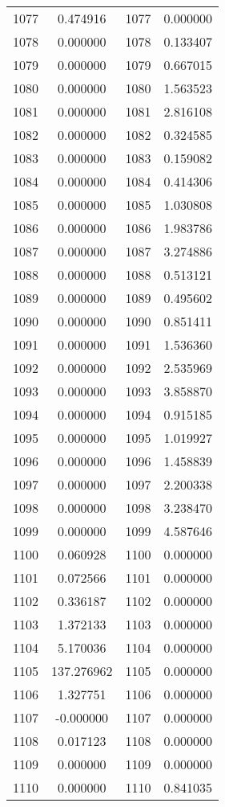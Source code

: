\documentclass[12pt]{article}
\begin{document}
\begin{longtable}{@{}cccc@{}}
1077 & 0.474916 & 1077 & 0.000000 \\
1078 & 0.000000 & 1078 & 0.133407 \\
1079 & 0.000000 & 1079 & 0.667015 \\
1080 & 0.000000 & 1080 & 1.563523 \\
1081 & 0.000000 & 1081 & 2.816108 \\
1082 & 0.000000 & 1082 & 0.324585 \\
1083 & 0.000000 & 1083 & 0.159082 \\
1084 & 0.000000 & 1084 & 0.414306 \\
1085 & 0.000000 & 1085 & 1.030808 \\
1086 & 0.000000 & 1086 & 1.983786 \\
1087 & 0.000000 & 1087 & 3.274886 \\
1088 & 0.000000 & 1088 & 0.513121 \\
1089 & 0.000000 & 1089 & 0.495602 \\
1090 & 0.000000 & 1090 & 0.851411 \\
1091 & 0.000000 & 1091 & 1.536360 \\
1092 & 0.000000 & 1092 & 2.535969 \\
1093 & 0.000000 & 1093 & 3.858870 \\
1094 & 0.000000 & 1094 & 0.915185 \\
1095 & 0.000000 & 1095 & 1.019927 \\
1096 & 0.000000 & 1096 & 1.458839 \\
1097 & 0.000000 & 1097 & 2.200338 \\
1098 & 0.000000 & 1098 & 3.238470 \\
1099 & 0.000000 & 1099 & 4.587646 \\
1100 & 0.060928 & 1100 & 0.000000 \\
1101 & 0.072566 & 1101 & 0.000000 \\
1102 & 0.336187 & 1102 & 0.000000 \\
1103 & 1.372133 & 1103 & 0.000000 \\
1104 & 5.170036 & 1104 & 0.000000 \\
1105 & 137.276962 & 1105 & 0.000000 \\
1106 & 1.327751 & 1106 & 0.000000 \\
1107 & -0.000000 & 1107 & 0.000000 \\
1108 & 0.017123 & 1108 & 0.000000 \\
1109 & 0.000000 & 1109 & 0.000000 \\
1110 & 0.000000 & 1110 & 0.841035 \\

\end{longtable}
\end{document}
